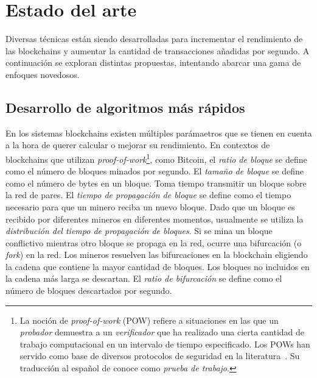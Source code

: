 
%

\section{Estado del arte}
Diversas técnicas están siendo desarrolladas para incrementar el rendimiento de las blockchains y
aumentar la cantidad de transacciones añadidas por segundo.
%
A continuación se exploran distintas propuestas, intentando abarcar una gama de enfoques novedosos.

\subsection{Desarrollo de algoritmos más rápidos}

En los sistemas blockchains existen múltiples parámaetros que se tienen en cuenta
a la hora de querer calcular o mejorar su rendimiento.
%
En contextos de blockchains que utilizan \emph{proof-of-work}\footnote{La noción de \emph{proof-of-work} (POW)
refiere a situaciones en las que un \emph{probador} demuestra a un \emph{verificador}
que ha realizado una cierta cantidad de trabajo computacional en un intervalo de tiempo especificado.
Los POWs han servido como base de diversos protocolos de seguridad en la literatura~\cite{Jakobsson1999ProofsOW}.
Su traducción al español de conoce como \emph{prueba de trabajo}.},
como Bitcoin, el \emph{ratio de bloque}
se define como el número de bloques minados por segundo.
%
El \emph{tamaño de bloque} se define como el número de bytes en un bloque.
%
Toma tiempo transmitir un bloque sobre la red de pares.
%
El \emph{tiempo de propagación de bloque} se define como el tiempo necesario para que un minero
reciba un nuevo bloque.
%
Dado que un bloque es recibido por diferentes mineros en diferentes momentos, usualmente se utiliza
la \emph{distribución del tiempo de propagación de bloques}.
%
Si se mina un bloque conflictivo mientras otro bloque se propaga en la red, ocurre una bifurcación
(o \emph{fork}) en la red.
%
Los mineros resuelven las bifurcaciones en la blockchain eligiendo la cadena que contiene la mayor
cantidad de bloques.
%
Los bloques no incluidos en la cadena más larga se descartan.
%
El \emph{ratio de bifurcación} se define como el número de bloques descartados por segundo.

